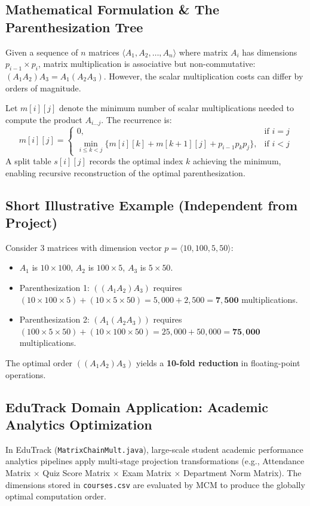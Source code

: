 \subsection{Mathematical Formulation \& The Parenthesization Tree}
Given a sequence of $n$ matrices $\langle A_1, A_2, \dots, A_n \rangle$ where matrix $A_i$ has dimensions $p_{i-1} \times p_i$, matrix multiplication is associative but non-commutative: $(A_1 A_2) A_3 = A_1 (A_2 A_3)$. However, the scalar multiplication costs can differ by orders of magnitude.

Let $m[i][j]$ denote the minimum number of scalar multiplications needed to compute the product $A_{i \dots j}$. The recurrence is:
\begin{equation}
m[i][j] = \begin{cases}
0, & \text{if } i = j \\
\min_{i \le k < j} \{ m[i][k] + m[k+1][j] + p_{i-1} p_k p_j \}, & \text{if } i < j
\end{cases}
\end{equation}
A split table $s[i][j]$ records the optimal index $k$ achieving the minimum, enabling recursive reconstruction of the optimal parenthesization.

\subsection{Short Illustrative Example (Independent from Project)}
Consider 3 matrices with dimension vector $p = \langle 10, 100, 5, 50 \rangle$:
\begin{itemize}
    \item $A_1$ is $10 \times 100$, $A_2$ is $100 \times 5$, $A_3$ is $5 \times 50$.
    \item Parenthesization 1: $((A_1 A_2) A_3)$ requires $(10 \times 100 \times 5) + (10 \times 5 \times 50) = 5{,}000 + 2{,}500 = \mathbf{7{,}500}$ multiplications.
    \item Parenthesization 2: $(A_1 (A_2 A_3))$ requires $(100 \times 5 \times 50) + (10 \times 100 \times 50) = 25{,}000 + 50{,}000 = \mathbf{75{,}000}$ multiplications.
\end{itemize}
The optimal order $((A_1 A_2) A_3)$ yields a \textbf{10-fold reduction} in floating-point operations.

\subsection{EduTrack Domain Application: Academic Analytics Optimization}
In EduTrack (\texttt{MatrixChainMult.java}), large-scale student academic performance analytics pipelines apply multi-stage projection transformations (e.g., Attendance Matrix $\times$ Quiz Score Matrix $\times$ Exam Matrix $\times$ Department Norm Matrix). The dimensions stored in \texttt{courses.csv} are evaluated by MCM to produce the globally optimal computation order.

